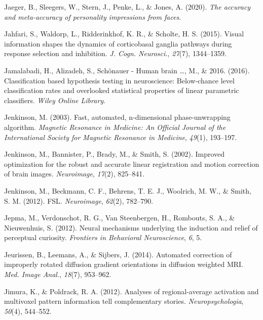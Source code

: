 \documentclass[11pt,american,a4paper,oneside,]{memoir} %
\begin{document}
\leavevmode\hypertarget{ref-Jaeger2020-bn}{}%
Jaeger, B., Sleegers, W., Stern, J., Penke, L., \& Jones, A. (2020). \emph{The accuracy and meta-accuracy of personality impressions from faces}.

\leavevmode\hypertarget{ref-Jahfari2015-ix}{}%
Jahfari, S., Waldorp, L., Ridderinkhof, K. R., \& Scholte, H. S. (2015). Visual information shapes the dynamics of corticobasal ganglia pathways during response selection and inhibition. \emph{J. Cogn. Neurosci.}, \emph{27}(7), 1344--1359.

\leavevmode\hypertarget{ref-Jamalabadi2016-gr}{}%
Jamalabadi, H., Alizadeh, S., Schönauer - Human brain \ldots, M., \& 2016. (2016). Classification based hypothesis testing in neuroscience: Below‐chance level classification rates and overlooked statistical properties of linear parametric classifiers. \emph{Wiley Online Library}.

\leavevmode\hypertarget{ref-jenkinson2003fast}{}%
Jenkinson, M. (2003). Fast, automated, n-dimensional phase-unwrapping algorithm. \emph{Magnetic Resonance in Medicine: An Official Journal of the International Society for Magnetic Resonance in Medicine}, \emph{49}(1), 193--197.

\leavevmode\hypertarget{ref-Jenkinson2002-wm}{}%
Jenkinson, M., Bannister, P., Brady, M., \& Smith, S. (2002). Improved optimization for the robust and accurate linear registration and motion correction of brain images. \emph{Neuroimage}, \emph{17}(2), 825--841.

\leavevmode\hypertarget{ref-Jenkinson2012-ui}{}%
Jenkinson, M., Beckmann, C. F., Behrens, T. E. J., Woolrich, M. W., \& Smith, S. M. (2012). FSL. \emph{Neuroimage}, \emph{62}(2), 782--790.

\leavevmode\hypertarget{ref-jepma2012neural}{}%
Jepma, M., Verdonschot, R. G., Van Steenbergen, H., Rombouts, S. A., \& Nieuwenhuis, S. (2012). Neural mechanisms underlying the induction and relief of perceptual curiosity. \emph{Frontiers in Behavioral Neuroscience}, \emph{6}, 5.

\leavevmode\hypertarget{ref-Jeurissen2014-cd}{}%
Jeurissen, B., Leemans, A., \& Sijbers, J. (2014). Automated correction of improperly rotated diffusion gradient orientations in diffusion weighted MRI. \emph{Med. Image Anal.}, \emph{18}(7), 953--962.

\leavevmode\hypertarget{ref-Jimura2012-lv}{}%
Jimura, K., \& Poldrack, R. A. (2012). Analyses of regional-average activation and multivoxel pattern information tell complementary stories. \emph{Neuropsychologia}, \emph{50}(4), 544--552.
\end{document}
